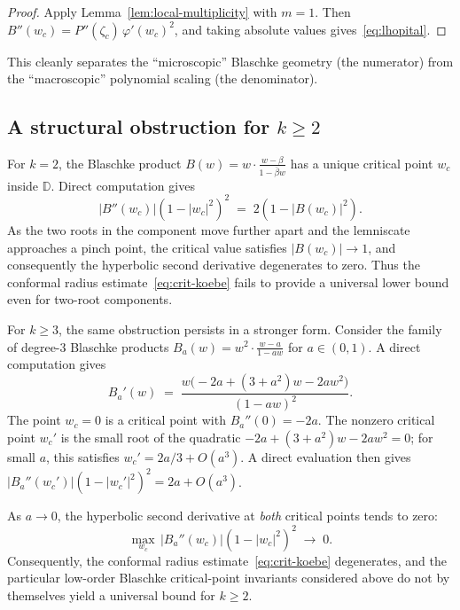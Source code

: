 \documentclass[11pt,a4paper]{amsart}
\theoremstyle{definition}
\newcommand{\D}{\mathbb{D}}
\newcommand{\abs}[1]{\lvert #1 \rvert}
\begin{document}
\begin{proof}
Apply Lemma~\ref{lem:local-multiplicity} with $m = 1$.  Then
$B''(w_c) = P''(\zeta_c)\,\varphi'(w_c)^2$,
and taking absolute values gives~\eqref{eq:lhopital}.
\end{proof}

This cleanly separates the ``microscopic'' Blaschke geometry (the
numerator) from the ``macroscopic'' polynomial scaling (the denominator).

\subsection{A structural obstruction for $k \geq 2$}
\label{sec:obstruction}

For $k = 2$, the Blaschke product $B(w) = w \cdot \frac{w-\beta}{1-\bar\beta w}$
has a unique critical point $w_c$ inside $\D$.  Direct computation gives
\begin{equation}\label{eq:k2-identity}
  \abs{B''(w_c)}(1-\abs{w_c}^2)^2 \;=\; 2(1 - \abs{B(w_c)}^2).
\end{equation}
As the two roots in the component move further apart and the lemniscate
approaches a pinch point, the critical value satisfies $\abs{B(w_c)} \to 1$,
and consequently the hyperbolic second derivative degenerates to zero.
Thus the conformal radius estimate~\eqref{eq:crit-koebe} fails to provide
a universal lower bound even for two-root components.

For $k \geq 3$, the same obstruction persists in a stronger form.
Consider the family of degree-$3$ Blaschke products
$B_a(w) = w^2 \cdot \frac{w-a}{1-aw}$ for $a \in (0,1)$.
A direct computation gives
\[
  B_a'(w) \;=\; \frac{w\bigl(-2a + (3+a^2)w - 2aw^2\bigr)}{(1-aw)^2}.
\]
The point $w_c = 0$ is a critical point with $B_a''(0) = -2a$.
The nonzero critical point $w_c'$ is the small root of the quadratic
$-2a + (3+a^2)w - 2aw^2 = 0$; for small $a$, this satisfies
$w_c' = 2a/3 + O(a^3)$.  A direct evaluation then gives
$\abs{B_a''(w_c')}(1-\abs{w_c'}^2)^2 = 2a + O(a^3)$.

As $a \to 0$, the hyperbolic second derivative at \emph{both}
critical points tends to zero:
\[
  \max_{w_c}\, \abs{B_a''(w_c)}(1-\abs{w_c}^2)^2 \;\to\; 0.
\]
Consequently, the conformal radius estimate~\eqref{eq:crit-koebe}
degenerates, and the particular low-order Blaschke critical-point
invariants considered above do not by themselves yield a universal
bound for $k \geq 2$.
\end{document}
